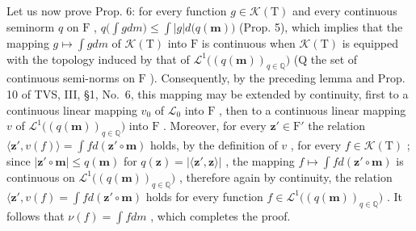 Let us now prove Prop. 6: for every function \(g \in \mathcal{K}(\mathrm{T})\) and every continuous seminorm \(q\) on \(\mathrm{F}\) , \(q\big(\int g dm\big) \leqslant \int |g| d\big(q(\mathbf{m})\big)\) (Prop. 5), which implies that the mapping \(g \mapsto \int g dm\) of \(\mathcal{K}(\mathrm{T})\) into \(\mathrm{F}\) is continuous when \(\mathcal{K}(\mathrm{T})\) is equipped with the topology induced by that of \(\mathcal{L}^1\big((q(\mathbf{m}))_{q \in \mathbb{Q}}\big)\) (Q the set of continuous semi-norms on \(\mathrm{F}\) ). Consequently, by the preceding lemma and Prop. 10 of TVS, III, §1, No.~6, this mapping may be extended by continuity, first to a continuous linear mapping \(v_0\) of \(\mathcal{L}_0\) into \(\mathrm{F}\) , then to a continuous linear mapping \(v\) of \(\mathcal{L}^1\big((q(\mathbf{m}))_{q \in \mathbb{Q}}\big)\) into \(\mathrm{F}\) . Moreover, for every \(\mathbf{z}' \in \mathrm{F}'\) the relation \(\langle \mathbf{z}', v(f) \rangle = \int f d(\mathbf{z}' \circ \mathbf{m})\) holds, by the definition of \(v\) , for every \(f \in \mathcal{K}(\mathrm{T})\) ; since \(|\mathbf{z}' \circ \mathbf{m}| \leqslant q(\mathbf{m})\) for \(q(\mathbf{z}) = |\langle \mathbf{z}', \mathbf{z} \rangle|\) , the mapping \(f \mapsto \int f d(\mathbf{z}' \circ \mathbf{m})\) is continuous on \(\mathcal{L}^1\big((q(\mathbf{m}))_{q \in \mathbb{Q}}\big)\) , therefore again by continuity, the relation \(\langle \mathbf{z}', v(f) = \int f d(\mathbf{z}' \circ \mathbf{m})\) holds for every function \(f \in \mathcal{L}^1\big((q(\mathbf{m}))_{q \in \mathbb{Q}}\big)\) . It follows that \(\nu(f) = \int f dm\) , which completes the proof.

